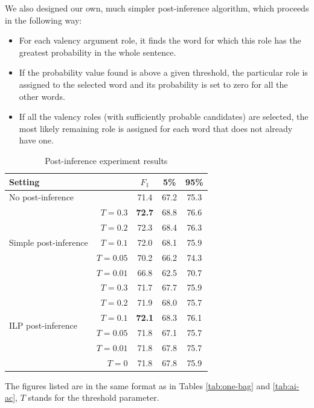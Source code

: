 \documentclass[12pt,notitlepage]{report}
\begin{document}
We also designed our own, much simpler post-inference algorithm, which proceeds in the following way:
\begin{itemize}
    \item For each valency argument role, it finds the word for which this role has the greatest probability in the whole sentence.
    \item If the probability value found is above a given threshold, the particular role is assigned to the selected word and its probability is set to zero for all the other words.
    \item If all the valency roles (with sufficiently probable candidates) are selected, the most likely remaining role is assigned for each word that does not already have one.
\end{itemize}

\begin{table}[htb]\label{tab:post-inference}
\caption{Post-inference experiment results}\footnotesize
\begin{center}
\begin{tabular}{|lr|c|c|c|}\hline
\multicolumn{2}{|l|}{\bf Setting} & $F_1$ & \bf 5\% & \bf 95\% \\\hline
\multicolumn{2}{|l|}{No post-inference} & 71.4 & 67.2 & 75.3 \\\hline
\multirow{5}{*}{Simple post-inference} & $T = 0.3$ & \bf 72.7 & 68.8 & 76.6 \\
& $T = 0.2$ & 72.3 & 68.4 & 76.3 \\
& $T = 0.1$ & 72.0 & 68.1 & 75.9 \\
& $T = 0.05$ & 70.2 & 66.2 & 74.3 \\
& $T = 0.01$ & 66.8 & 62.5 & 70.7 \\\hline
\multirow{6}{*}{ILP post-inference} & $T = 0.3$ & 71.7 & 67.7 & 75.9 \\
& $T = 0.2$ & 71.9 & 68.0 & 75.7 \\
& $T = 0.1$ & \bf 72.1 & 68.3 & 76.1 \\
& $T = 0.05$ & 71.8 & 67.1 & 75.7 \\
& $T = 0.01$ & 71.8 & 67.8 & 75.7 \\
& $T = 0$ & 71.8 & 67.8 & 75.9 \\\hline
\end{tabular}
\end{center}
The figures listed are in the same format as in Tables \ref{tab:one-bag} and \ref{tab:ai-ac}, $T$ stands for the threshold parameter.
\end{table}
\end{document}
